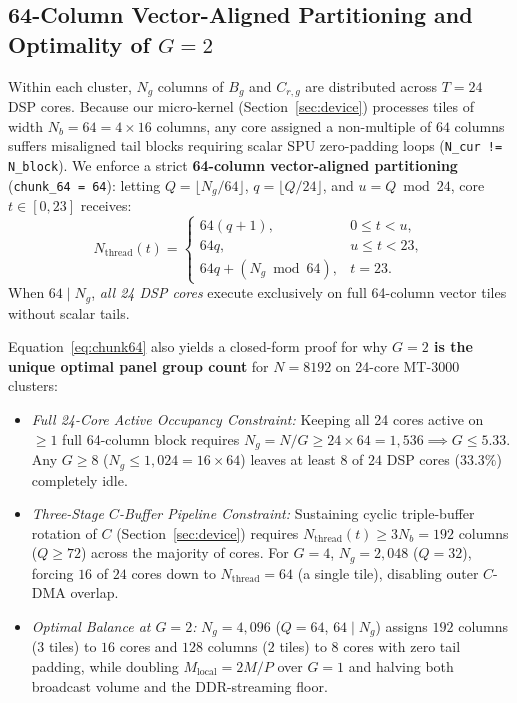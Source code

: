\documentclass[journal]{IEEEtran}
\begin{document}
\subsection{64-Column Vector-Aligned Partitioning and Optimality of $G=2$}
Within each cluster, $N_g$ columns of $B_g$ and $C_{r,g}$ are distributed across $T = 24$ DSP cores. Because our micro-kernel (Section~\ref{sec:device}) processes tiles of width $N_b = 64 = 4 \times 16$ columns, any core assigned a non-multiple of $64$ columns suffers misaligned tail blocks requiring scalar SPU zero-padding loops (\texttt{N\_cur != N\_block}). We enforce a strict \textbf{64-column vector-aligned partitioning} (\texttt{chunk\_64 = 64}): letting $Q = \lfloor N_g / 64 \rfloor$, $q = \lfloor Q / 24 \rfloor$, and $u = Q \bmod 24$, core $t \in [0, 23]$ receives:
\begin{equation}
N_{\mathrm{thread}}(t) = \begin{cases}
64(q + 1), & 0 \le t < u, \\
64 q, & u \le t < 23, \\
64 q + (N_g \bmod 64), & t = 23.
\end{cases}
\label{eq:chunk64}
\end{equation}
When $64 \mid N_g$, \emph{all 24 DSP cores} execute exclusively on full 64-column vector tiles without scalar tails.

Equation~\eqref{eq:chunk64} also yields a closed-form proof for why \textbf{$G = 2$ is the unique optimal panel group count} for $N = 8192$ on 24-core MT-3000 clusters:
\begin{itemize}\setlength{\itemsep}{1pt}\setlength{\parskip}{0pt}
    \item \emph{Full 24-Core Active Occupancy Constraint:} Keeping all 24 cores active on $\ge 1$ full 64-column block requires $N_g = N/G \ge 24 \times 64 = 1{,}536 \implies G \le 5.33$. Any $G \ge 8$ ($N_g \le 1{,}024 = 16 \times 64$) leaves at least $8$ of $24$ DSP cores ($33.3\%$) completely idle.
    \item \emph{Three-Stage $C$-Buffer Pipeline Constraint:} Sustaining cyclic triple-buffer rotation of $C$ (Section~\ref{sec:device}) requires $N_{\mathrm{thread}}(t) \ge 3 N_b = 192$ columns ($Q \ge 72$) across the majority of cores. For $G = 4$, $N_g = 2{,}048$ ($Q = 32$), forcing $16$ of $24$ cores down to $N_{\mathrm{thread}} = 64$ (a single tile), disabling outer $C$-DMA overlap.
    \item \emph{Optimal Balance at $G = 2$:} $N_g = 4{,}096$ ($Q = 64$, $64 \mid N_g$) assigns $192$ columns ($3$ tiles) to $16$ cores and $128$ columns ($2$ tiles) to $8$ cores with zero tail padding, while doubling $M_{\mathrm{local}} = 2M/P$ over $G=1$ and halving both broadcast volume and the DDR-streaming floor.
\end{itemize}
\end{document}
